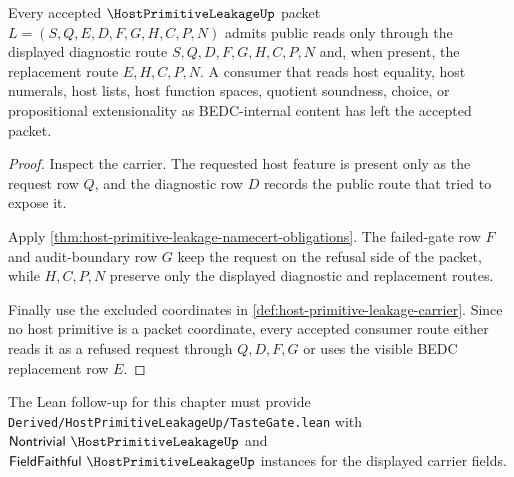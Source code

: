 \begin{theorem}
\label{thm:host-primitive-leakage-nonescape}
Every accepted $\HostPrimitiveLeakageUp$ packet $L=(S,Q,E,D,F,G,H,C,P,N)$ admits public reads only through the displayed diagnostic route $S,Q,D,F,G,H,C,P,N$ and, when present, the replacement route $E,H,C,P,N$. A consumer that reads host equality, host numerals, host lists, host function spaces, quotient soundness, choice, or propositional extensionality as BEDC-internal content has left the accepted packet.
\end{theorem}
\begin{proof}
Inspect the carrier. The requested host feature is present only as the request row $Q$, and the diagnostic row $D$ records the public route that tried to expose it.

Apply \autoref{thm:host-primitive-leakage-namecert-obligations}. The failed-gate row $F$ and audit-boundary row $G$ keep the request on the refusal side of the packet, while $H,C,P,N$ preserve only the displayed diagnostic and replacement routes.

Finally use the excluded coordinates in \autoref{def:host-primitive-leakage-carrier}. Since no host primitive is a packet coordinate, every accepted consumer route either reads it as a refused request through $Q,D,F,G$ or uses the visible BEDC replacement row $E$.
\end{proof}



The Lean follow-up for this chapter must provide \texttt{Derived/HostPrimitiveLeakageUp/TasteGate.lean} with $\mathsf{Nontrivial}\ \HostPrimitiveLeakageUp$ and $\mathsf{FieldFaithful}\ \HostPrimitiveLeakageUp$ instances for the displayed carrier fields.

